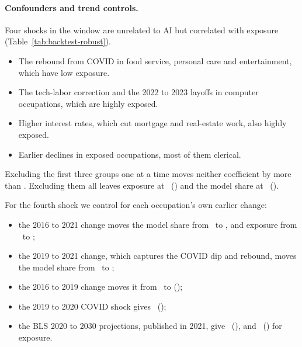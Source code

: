 \paragraph{Confounders and trend controls.} Four shocks in the window are unrelated to AI but correlated with exposure (Table~\ref{tab:backtest-robust}).
\begin{itemize}
\item The rebound from COVID in food service, personal care and entertainment, which have low exposure.
\item The tech-labor correction and the 2022 to 2023 layoffs in computer occupations, which are highly exposed.
\item Higher interest rates, which cut mortgage and real-estate work, also highly exposed.
\item Earlier declines in exposed occupations, most of them clerical.
\end{itemize}
Excluding the first three groups one at a time moves neither coefficient by more than \btExclMaxMove. Excluding them all leaves exposure at \btEExclB\ (\btEExclSe) and the model share at \btMExclB\ (\btMExclSe).

For the fourth shock we control for each occupation's own earlier change:
\begin{itemize}
\item the 2016 to 2021 change moves the model share from \btMTrendBaseB\ to \btMTrendCtlB, and exposure from \btETrendBaseB\ to \btETrendCtlB;
\item the 2019 to 2021 change, which captures the COVID dip and rebound, moves the model share from \btMNineBaseB\ to \btMNineCtlB;
\item the 2016 to 2019 change moves it from \btMSixBaseB\ to \btMSixCtlB (\btMSixCtlSe);
\item the 2019 to 2020 COVID shock gives \btMCovidB\ (\btMCovidSe);
\item the BLS 2020 to 2030 projections, published in 2021, give \btMProjB\ (\btMProjSe), and \btEProjB\ (\btEProjSe) for exposure.
\end{itemize}

